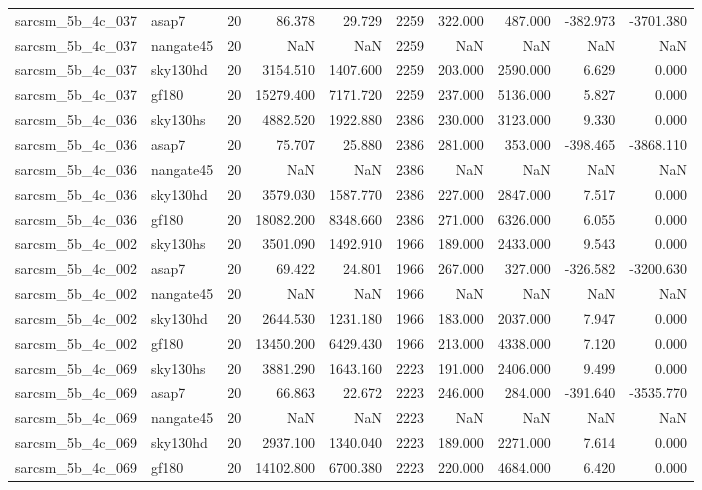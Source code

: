 \begin{longtable}{llrrrrrrrr}
sarcsm\_5b\_4c\_037 & asap7 & 20 & 86.378 & 29.729 & 2259 & 322.000 & 487.000 & -382.973 & -3701.380 \\
sarcsm\_5b\_4c\_037 & nangate45 & 20 & NaN & NaN & 2259 & NaN & NaN & NaN & NaN \\
sarcsm\_5b\_4c\_037 & sky130hd & 20 & 3154.510 & 1407.600 & 2259 & 203.000 & 2590.000 & 6.629 & 0.000 \\
sarcsm\_5b\_4c\_037 & gf180 & 20 & 15279.400 & 7171.720 & 2259 & 237.000 & 5136.000 & 5.827 & 0.000 \\
sarcsm\_5b\_4c\_036 & sky130hs & 20 & 4882.520 & 1922.880 & 2386 & 230.000 & 3123.000 & 9.330 & 0.000 \\
sarcsm\_5b\_4c\_036 & asap7 & 20 & 75.707 & 25.880 & 2386 & 281.000 & 353.000 & -398.465 & -3868.110 \\
sarcsm\_5b\_4c\_036 & nangate45 & 20 & NaN & NaN & 2386 & NaN & NaN & NaN & NaN \\
sarcsm\_5b\_4c\_036 & sky130hd & 20 & 3579.030 & 1587.770 & 2386 & 227.000 & 2847.000 & 7.517 & 0.000 \\
sarcsm\_5b\_4c\_036 & gf180 & 20 & 18082.200 & 8348.660 & 2386 & 271.000 & 6326.000 & 6.055 & 0.000 \\
sarcsm\_5b\_4c\_002 & sky130hs & 20 & 3501.090 & 1492.910 & 1966 & 189.000 & 2433.000 & 9.543 & 0.000 \\
sarcsm\_5b\_4c\_002 & asap7 & 20 & 69.422 & 24.801 & 1966 & 267.000 & 327.000 & -326.582 & -3200.630 \\
sarcsm\_5b\_4c\_002 & nangate45 & 20 & NaN & NaN & 1966 & NaN & NaN & NaN & NaN \\
sarcsm\_5b\_4c\_002 & sky130hd & 20 & 2644.530 & 1231.180 & 1966 & 183.000 & 2037.000 & 7.947 & 0.000 \\
sarcsm\_5b\_4c\_002 & gf180 & 20 & 13450.200 & 6429.430 & 1966 & 213.000 & 4338.000 & 7.120 & 0.000 \\
sarcsm\_5b\_4c\_069 & sky130hs & 20 & 3881.290 & 1643.160 & 2223 & 191.000 & 2406.000 & 9.499 & 0.000 \\
sarcsm\_5b\_4c\_069 & asap7 & 20 & 66.863 & 22.672 & 2223 & 246.000 & 284.000 & -391.640 & -3535.770 \\
sarcsm\_5b\_4c\_069 & nangate45 & 20 & NaN & NaN & 2223 & NaN & NaN & NaN & NaN \\
sarcsm\_5b\_4c\_069 & sky130hd & 20 & 2937.100 & 1340.040 & 2223 & 189.000 & 2271.000 & 7.614 & 0.000 \\
sarcsm\_5b\_4c\_069 & gf180 & 20 & 14102.800 & 6700.380 & 2223 & 220.000 & 4684.000 & 6.420 & 0.000 \\

\end{longtable}
